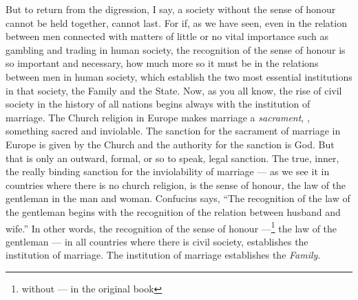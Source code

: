 \vspace{0.5cm}
But to return from the digression, I say, a society without the sense of honour cannot be held together, cannot last.
For if, as we have seen, even in the relation between men connected with matters of little or no vital importance such as gambling and trading in human society, the recognition of the sense of honour is so important and necessary, how much more so it must be in the relations between men in human society, which establish the two most essential institutions in that society, the Family and the State.
Now, as you all know, the rise of civil society in the history of all nations begins always with the institution of marriage.
The Church religion in Europe makes marriage a \emph{sacrament}, \ie, something sacred and inviolable.
The sanction for the sacrament of marriage in Europe is given by the Church and the authority for the sanction is God.
But that is only an outward, formal, or so to speak, legal sanction.
The true, inner, the really binding sanction for the inviolability of marriage --- as we see it in countries where there is no church religion, is the sense of honour, the law of the gentleman in the man and woman.
Confucius says, ``The recognition of the law of the gentleman begins with the recognition of the relation between husband and wife.''\cite{num15}
In other words, the recognition of the sense of honour ---\footnote{without --- in the original book} the law of the gentleman --- in all countries where there is civil society, establishes the institution of marriage.
The institution of marriage establishes the \emph{Family}.

